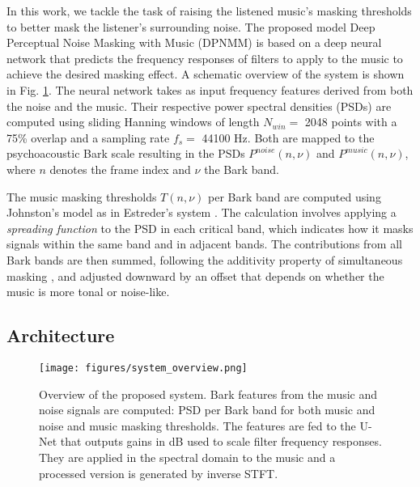 In this work, we tackle the task of raising the listened music's masking thresholds to better mask the listener's surrounding noise.
The proposed model Deep Perceptual Noise Masking with Music (DPNMM) is based on a deep neural network that predicts the frequency responses of filters to apply to the music to achieve the desired masking effect. A schematic overview of the system is shown in Fig. \ref{fig:system_overview}. The neural network takes as input frequency features derived from both the noise and the music. Their respective power spectral densities (PSDs) are computed using sliding Hanning windows of length $N_{win}=$ 2048 points with a 75\% overlap and a sampling rate $f_s=$ 44100 Hz.  
Both are mapped to the psychoacoustic Bark scale \cite{zwickerPsychoacousticsFactsModels2010} resulting in the PSDs $P^{noise}(n, \nu)$ and $P^{music}(n, \nu)$, where $n$ denotes the frame index and $\nu$ the Bark band. 

The music masking thresholds $T(n, \nu)$ per Bark band are computed using Johnston's model \cite{johnstonTransformCodingAudio1988} as in Estreder's system \cite{estrederPerceptualAudioEqualization2018}. The calculation involves applying a \textit{spreading function} to the PSD in each critical band, which indicates how it masks signals within the same band and in adjacent bands. The contributions from all Bark bands are then summed, following the additivity property of simultaneous masking \cite{lutfiAdditivitySimultaneousMasking1983, johnstonTransformCodingAudio1988, humesModelsAdditivityMasking1989}, and adjusted downward by an offset that depends on whether the music is more tonal or noise-like.

\subsection{Architecture}
\begin{figure}
    \centering
    \texttt{[image: figures/system\_overview.png]}
    \caption{Overview of the proposed system. Bark features from the music and noise signals are computed: PSD per Bark band for both music and noise and music masking thresholds. The features are fed to the U-Net that outputs gains in dB used to scale filter frequency responses. They are applied in the spectral domain to the music and a processed version is generated by inverse STFT.}\vspace{-0.3cm}
    \label{fig:system_overview}
\end{figure}

